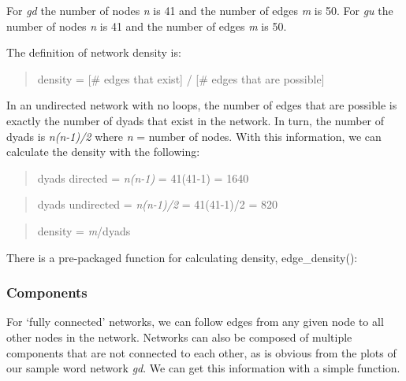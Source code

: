 \documentclass[
]{article}
\newenvironment{Shaded}{\begin{snugshade}}{\end{snugshade}}
\newcommand{\DecValTok}[1]{\textcolor[rgb]{0.00,0.00,0.81}{#1}}
\newcommand{\FunctionTok}[1]{\textcolor[rgb]{0.13,0.29,0.53}{\textbf{#1}}}
\newcommand{\NormalTok}[1]{#1}
\newcommand{\SpecialCharTok}[1]{\textcolor[rgb]{0.81,0.36,0.00}{\textbf{#1}}}
\begin{document}
\footnotesize

\normalsize

For \emph{gd} the number of nodes \emph{n} is 41 and the number of edges \emph{m} is 50.
For \emph{gu} the number of nodes \emph{n} is 41 and the number of edges \emph{m} is 50.

The definition of network density is:

\begin{quote}
density = {[}\# edges that exist{]} / {[}\# edges that are possible{]}
\end{quote}

In an undirected network with no loops, the number of edges that are possible is exactly the number of dyads that exist in the network. In turn, the number of dyads is \emph{n(n-1)/2} where \emph{n} = number of nodes. With this information, we can calculate the density with the following:

\begin{quote}
dyads directed = \emph{n(n-1)} = 41(41-1) = 1640
\end{quote}

\begin{quote}
dyads undirected = \emph{n(n-1)/2} = 41(41-1)/2 = 820
\end{quote}

\begin{quote}
density = \emph{m}/dyads
\end{quote}

There is a pre-packaged function for calculating density, edge\_density():

\footnotesize

\normalsize

\hypertarget{components}{%
\subsubsection{Components}\label{components}}

For `fully connected' networks, we can follow edges from any given node to all other nodes in the network. Networks can also be composed of multiple components that are not connected to each other, as is obvious from the plots of our sample word network \emph{gd}. We can get this information with a simple function.

\begin{Shaded}
\end{Shaded}
\end{document}
